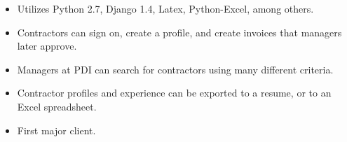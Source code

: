 \documentclass[overlapped]{res}
\begin{document}
\begin{resume}
\begin{itemize}[leftmargin=0in]
\begin{itemize}[leftmargin=0in]
\begin{samepage}
                    \begin{itemize}
                        \item[\textbullet] Utilizes Python 2.7, Django 1.4, Latex, Python-Excel, among others.
                        \item[\textbullet] Contractors can sign on, create a profile, and create invoices that managers later approve.
                        \item[\textbullet] Managers at PDI can search for contractors using many different criteria.
                        \item[\textbullet] Contractor profiles and experience can be exported to a resume, or to an Excel spreadsheet.
                        \item[\textbullet] First major client.
                    \end{itemize}
                \end{samepage}
        \end{itemize}
\end{itemize}


\end{resume}
\end{document}
